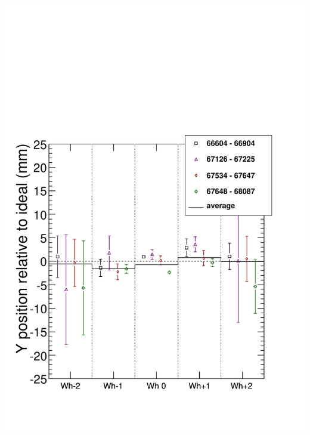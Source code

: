 \documentclass[compress]{beamer}
\begin{document}
\begin{frame}
{\begin{columns}
\includegraphics[width=\linewidth]{bydataset_MP_y.pdf}
\end{columns}}
\end{frame}
\end{document}
